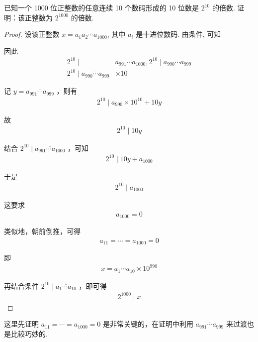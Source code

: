 \begin{example}
已知一个 1000 位正整数的任意连续 10 个数码形成的 10 位数是 $2^{10}$ 的倍数. 证明：该正整数为 $2^{1000}$ 的倍数. 
\end{example}
\begin{proof}
设该正整数 $x=\overline{a_{1} a_{2} \cdots a_{1000}}$, 其中 $a_{i}$ 是十进位数码. 由条件, 可知

因此
\begin{align}
2^{10} \mid & \overline{a_{991} \cdots a_{1000}}, 2^{10} \mid \overline{a_{990} \cdots a_{999}} \\
2^{10} \mid \overline{a_{990} \cdots a_{999}} & \times 10
\end{align}

记 $y=\overline{a_{991} \cdots a_{999}}$ ，则有
\begin{align*}
2^{10} \mid a_{990} \times 10^{10}+10 y
\end{align*}

故
\begin{align*}
2^{10} \mid 10 y
\end{align*}

结合 $2^{10} \mid \overline{a_{991} \cdots a_{1000}}$ ，可知
\begin{align*}
2^{10} \mid 10 y+a_{1000}
\end{align*}

于是
\begin{align*}
2^{10} \mid a_{1000}
\end{align*}

这要求
\begin{align*}
a_{1000}=0
\end{align*}

类似地，朝前倒推，可得
\begin{align*}
a_{11}=\cdots=a_{1000}=0
\end{align*}

即
\begin{align*}
x=\overline{a_{1} \cdots a_{10}} \times 10^{990}
\end{align*}

再结合条件 $2^{10} \mid \overline{a_{1} \cdots a_{10}}$ ，即可得
\begin{align*}
2^{1000} \mid x
\end{align*}
\end{proof}
\begin{note}
这里先证明 $a_{11}=\cdots=a_{1000}=0$ 是非常关键的，在证明中利用 $\overline{a_{991} \cdots a_{999}}$ 来过渡也是比较巧妙的. 
\end{note}

